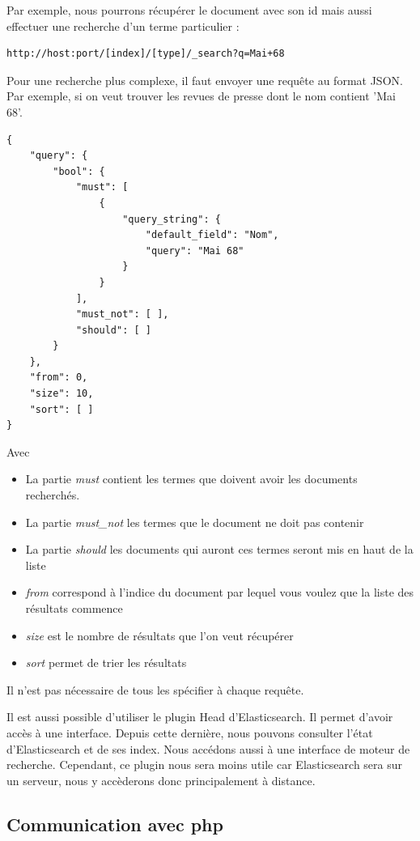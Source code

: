 Par exemple, nous pourrons récupérer le document avec son id mais aussi effectuer une recherche d’un terme particulier :
\begin{verbatim}
http://host:port/[index]/[type]/_search?q=Mai+68
\end{verbatim}

Pour une recherche plus complexe, il faut envoyer une requête au format JSON. Par exemple, si on veut trouver les revues de presse dont le nom contient 'Mai 68'.

\begin{verbatim}
{
    "query": {
        "bool": {
            "must": [
                {
                    "query_string": {
                        "default_field": "Nom",
                        "query": "Mai 68"
                    }
                }
            ],
            "must_not": [ ],
            "should": [ ]
        }
    },
    "from": 0,
    "size": 10,
    "sort": [ ]
}
\end{verbatim}

Avec
\begin{itemize}
	\item La partie \textit{must} contient les termes que doivent avoir les documents recherchés.
	\item La partie \textit{must\_not} les termes que le document ne doit pas contenir
	\item La partie \textit{should} les documents qui auront ces termes seront mis en haut de la liste
	\item \textit{from} correspond à l'indice du document par lequel vous voulez que la liste des résultats commence
	\item \textit {size} est le nombre de résultats que l'on veut récupérer
	\item \textit{sort} permet de trier les résultats
\end{itemize}
Il n'est pas nécessaire de tous les spécifier à chaque requête.


Il est aussi possible d’utiliser le plugin Head d’Elasticsearch. Il permet d’avoir accès à une interface. Depuis cette dernière, nous pouvons consulter l’état d’Elasticsearch et de ses index. Nous accédons aussi à une interface de moteur de recherche. Cependant, ce plugin nous sera moins utile car Elasticsearch sera sur un serveur, nous y accèderons donc principalement à distance.

\subsection{Communication avec php}
